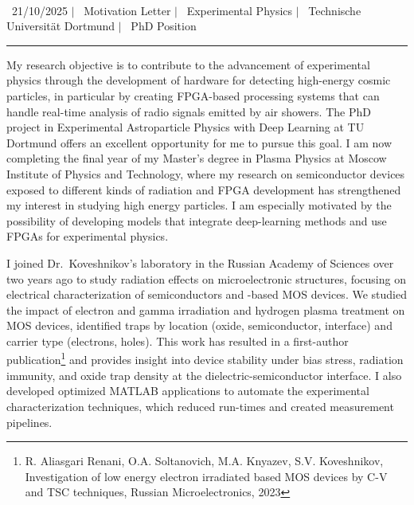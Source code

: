 \documentclass[a4paper,12pt]{article}
\begin{document}
\begin{center}
    {\Huge \scshape {\fontsize{25}{30}\selectfont{Reza}} {\fontsize{25}{30}}} \\ \vspace{3pt}
    {\small \raisebox{-0.2\height}\ {21/10/2025}} $|$
    {\small \raisebox{-0.2\height}\ {Motivation Letter}} $|$
    {\small \raisebox{-0.2\height}\ {Experimental Physics}} $|$
    {\small \raisebox{-0.2\height}\ {Technische Universität Dortmund}} $|$
    {\small \raisebox{-0.2\height}\ {PhD Position}}
    \vspace{-10pt}
\end{center}
\vspace{-10pt}
\noindent\rule{\textwidth}{0.5pt}

My research objective is to contribute to the advancement of experimental physics through the development of hardware for detecting high-energy cosmic particles, in particular by creating FPGA-based processing systems that can handle real-time analysis of radio signals emitted by air showers. The PhD project in Experimental Astroparticle Physics with Deep Learning at TU Dortmund offers an excellent opportunity for me to pursue this goal. I am now completing the final year of my Master’s degree in Plasma Physics at Moscow Institute of Physics and Technology, where my research on semiconductor devices exposed to different kinds of radiation and FPGA development has strengthened my interest in studying high energy particles. I am especially motivated by the possibility of developing models that integrate deep-learning methods and use FPGAs for experimental physics.

\vspace{10pt}
I joined Dr.\ Koveshnikov's laboratory in the Russian Academy of Sciences over two years ago to study radiation effects on microelectronic structures, focusing on electrical characterization of semiconductors and -based MOS devices. We studied the impact of electron and gamma irradiation and hydrogen plasma treatment on MOS devices, identified traps by location (oxide, semiconductor, interface) and carrier type (electrons, holes). This work has resulted in a first-author publication\footnote{R. Aliasgari Renani, O.A. Soltanovich, M.A. Knyazev, S.V. Koveshnikov, Investigation of low energy electron irradiated  based MOS devices by C-V and TSC techniques, Russian Microelectronics, 2023} and provides insight into device stability under bias stress, radiation immunity, and oxide trap density at the dielectric-semiconductor interface. I also developed optimized MATLAB applications to automate the experimental characterization techniques, which reduced run-times and created measurement pipelines. 
\end{document}
